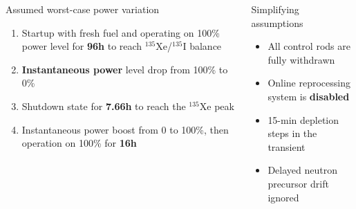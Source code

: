 \begin{frame}
\begin{columns}
	\column[t]{6cm}
	\begin{block}{Assumed worst-case power variation}
		\begin{enumerate}             
			\item Startup with fresh fuel and operating on 100\% power
			level for \textbf{96h} to reach $^{135}$Xe/$^{135}$I balance
			\item \textbf{Instantaneous power} level drop from 100\% to 0\%
			\item Shutdown state for \textbf{7.66h} to reach the 
			$^{135}$Xe peak
			\item Instantaneous power boost from 0 to 100\%, then operation 
			on 100\% for \textbf{16h}
		\end{enumerate}
	\end{block}
			\vspace{-2mm}
	\begin{block}{Simplifying assumptions}
		\begin{itemize}
			\item All control rods are fully withdrawn
			\item Online reprocessing system is \textbf{disabled}
			\item 15-min depletion steps in the transient
			\item Delayed
neutron precursor drift ignored
		\end{itemize}

	\end{block}
\end{columns}
\end{frame}